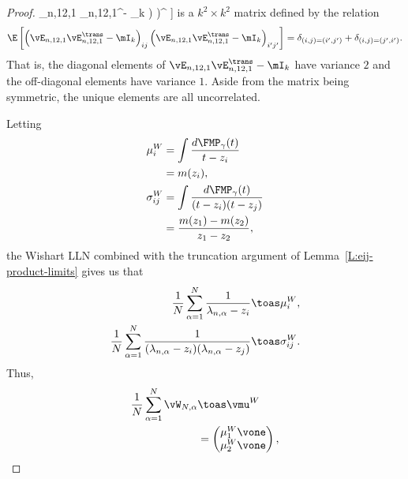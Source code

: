 \begin{proof}
                    \vE_{n,12,1} \vE_{n,12,1}^\trans - \mI_k
                \right) \! \!
            \Big)^{\! \trans}
        \Big]
    \)
    is a $k^2 \times k^2$ matrix defined by the relation
    \[
        \E \left[
            \left( 
                \vE_{n,12,1} \vE_{n,12,1}^\trans - \mI_k
            \right)_{ij}
            \left( 
                \vE_{n,12,1} \vE_{n,12,1}^\trans - \mI_k
            \right)_{i'j'}
        \right]
        =
        \delta_{(i,j) = (i',j')}
        +
        \delta_{(i,j) = (j',i')}.
    \]
    That is, the diagonal elements of 
    $\vE_{n,12,1} \vE_{n,12,1}^\trans - \mI_k$ have variance $2$ and
    the off-diagonal elements have variance $1$.  Aside from the matrix
    being symmetric, the unique elements are all uncorrelated.
    
    Letting
    \begin{align*}
        \mu^W_i
            &=
                \int \frac{ d\FMP_\gamma(t) }
                          { t - z_i } \\
            &=
                m( z_i ), \\
        \sigma^W_{ij}
            &=
                \int \frac{ d\FMP_\gamma(t) }
                          { (t - z_i)(t - z_j) } \\
            &=
                \frac{ m( z_1 ) - m( z_2 ) }
                     { z_1 - z_2 },
    \end{align*}
    the Wishart LLN combined with the truncation argument of
    Lemma~\ref{L:eij-product-limits} gives us that
    \begin{align*}
        \frac{1}{N}
        \sum_{\alpha=1}^N
            \frac{1}{  \lambda_{n,\alpha} - z_i  }
            &\toas
                \mu^W_{i}, \\
        \frac{1}{N}
        \sum_{\alpha=1}^N
            \frac{1}{ ( \lambda_{n,\alpha} - z_i )
                      ( \lambda_{n,\alpha} - z_j ) }
            &\toas
                \sigma^W_{ij}.
    \end{align*}
    Thus,
    \begin{align*}
        \frac{1}{N}
        \sum_{\alpha=1}^N
            \vW_{N,\alpha}
            &\toas
                \vmu^W \\
            &=
                \left(
                \begin{matrix}
                    \mu^W_1 \vone \\
                    \mu^W_2 \vone
                \end{matrix}
                \right), \\

\end{align*}
\end{proof}
